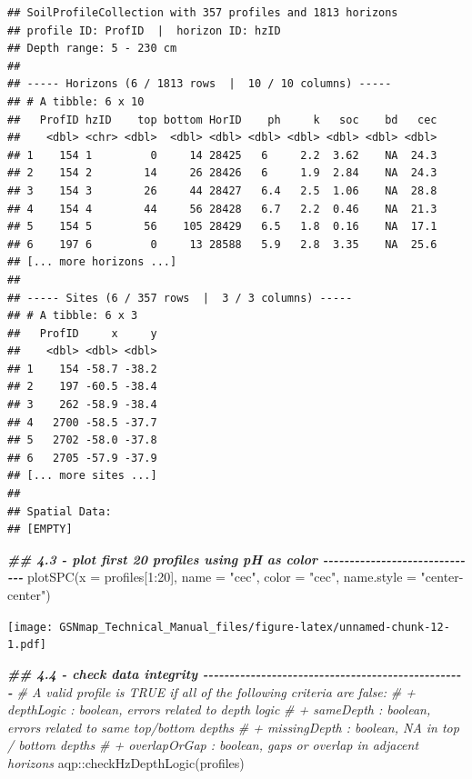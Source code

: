 \documentclass[
  10pt,
  b5paper,
  oneside]{book}
\newenvironment{Shaded}{\begin{snugshade}}{\end{snugshade}}
\newcommand{\AttributeTok}[1]{\textcolor[rgb]{0.77,0.63,0.00}{#1}}
\newcommand{\CommentTok}[1]{\textcolor[rgb]{0.56,0.35,0.01}{\textit{#1}}}
\newcommand{\DecValTok}[1]{\textcolor[rgb]{0.00,0.00,0.81}{#1}}
\newcommand{\DocumentationTok}[1]{\textcolor[rgb]{0.56,0.35,0.01}{\textbf{\textit{#1}}}}
\newcommand{\FunctionTok}[1]{\textcolor[rgb]{0.00,0.00,0.00}{#1}}
\newcommand{\NormalTok}[1]{#1}
\newcommand{\SpecialCharTok}[1]{\textcolor[rgb]{0.00,0.00,0.00}{#1}}
\newcommand{\StringTok}[1]{\textcolor[rgb]{0.31,0.60,0.02}{#1}}
\begin{document}
\begin{verbatim}
## SoilProfileCollection with 357 profiles and 1813 horizons
## profile ID: ProfID  |  horizon ID: hzID 
## Depth range: 5 - 230 cm
## 
## ----- Horizons (6 / 1813 rows  |  10 / 10 columns) -----
## # A tibble: 6 x 10
##   ProfID hzID    top bottom HorID    ph     k   soc    bd   cec
##    <dbl> <chr> <dbl>  <dbl> <dbl> <dbl> <dbl> <dbl> <dbl> <dbl>
## 1    154 1         0     14 28425   6     2.2  3.62    NA  24.3
## 2    154 2        14     26 28426   6     1.9  2.84    NA  24.3
## 3    154 3        26     44 28427   6.4   2.5  1.06    NA  28.8
## 4    154 4        44     56 28428   6.7   2.2  0.46    NA  21.3
## 5    154 5        56    105 28429   6.5   1.8  0.16    NA  17.1
## 6    197 6         0     13 28588   5.9   2.8  3.35    NA  25.6
## [... more horizons ...]
## 
## ----- Sites (6 / 357 rows  |  3 / 3 columns) -----
## # A tibble: 6 x 3
##   ProfID     x     y
##    <dbl> <dbl> <dbl>
## 1    154 -58.7 -38.2
## 2    197 -60.5 -38.4
## 3    262 -58.9 -38.4
## 4   2700 -58.5 -37.7
## 5   2702 -58.0 -37.8
## 6   2705 -57.9 -37.9
## [... more sites ...]
## 
## Spatial Data:
## [EMPTY]
\end{verbatim}

\begin{Shaded}
\begin{Highlighting}[]
\DocumentationTok{\#\# 4.3 {-} plot first 20 profiles using pH as color {-}{-}{-}{-}{-}{-}{-}{-}{-}{-}{-}{-}{-}{-}{-}{-}{-}{-}{-}{-}{-}{-}{-}{-}{-}{-}{-}{-}{-}{-}}
\FunctionTok{plotSPC}\NormalTok{(}\AttributeTok{x =}\NormalTok{ profiles[}\DecValTok{1}\SpecialCharTok{:}\DecValTok{20}\NormalTok{], }\AttributeTok{name =} \StringTok{"cec"}\NormalTok{, }\AttributeTok{color =} \StringTok{"cec"}\NormalTok{,}
        \AttributeTok{name.style =} \StringTok{"center{-}center"}\NormalTok{)}
\end{Highlighting}
\end{Shaded}

\texttt{[image: GSNmap\_Technical\_Manual\_files/figure-latex/unnamed-chunk-12-1.pdf]}

\begin{Shaded}
\begin{Highlighting}[]
\DocumentationTok{\#\# 4.4 {-} check data integrity {-}{-}{-}{-}{-}{-}{-}{-}{-}{-}{-}{-}{-}{-}{-}{-}{-}{-}{-}{-}{-}{-}{-}{-}{-}{-}{-}{-}{-}{-}{-}{-}{-}{-}{-}{-}{-}{-}{-}{-}{-}{-}{-}{-}{-}{-}{-}{-}{-}{-}}
\CommentTok{\# A valid profile is TRUE if all of the following criteria are false:}
\CommentTok{\#    + depthLogic : boolean, errors related to depth logic}
\CommentTok{\#    + sameDepth : boolean, errors related to same top/bottom depths}
\CommentTok{\#    + missingDepth : boolean, NA in top / bottom depths}
\CommentTok{\#    + overlapOrGap : boolean, gaps or overlap in adjacent horizons}
\NormalTok{aqp}\SpecialCharTok{::}\FunctionTok{checkHzDepthLogic}\NormalTok{(profiles)}
\end{Highlighting}
\end{Shaded}
\end{document}
